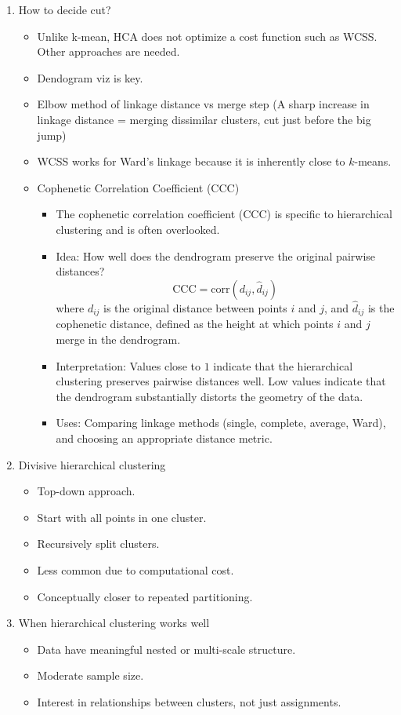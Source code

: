 \documentclass{article}
\begin{document}
\begin{enumerate}
\item How to decide cut?
\begin{itemize}
\item Unlike k-mean, HCA does not optimize a cost function such as WCSS. Other approaches are needed.
\item Dendogram viz is key. 
\item Elbow method of linkage distance vs merge step (A sharp increase in linkage distance = merging dissimilar clusters, cut just before the big jump)
\item WCSS works for Ward's linkage because it is inherently close to $k$-means.
\item Cophenetic Correlation Coefficient (CCC)
\begin{itemize}
\item The cophenetic correlation coefficient (CCC) is specific to hierarchical clustering and is often overlooked.
\item Idea: How well does the dendrogram preserve the original pairwise distances?
\[
\mathrm{CCC} = \mathrm{corr}\!\left( d_{ij}, \hat{d}_{ij} \right)
\]
where $d_{ij}$ is the original distance between points $i$ and $j$, and $\hat{d}_{ij}$ is the cophenetic distance, defined as the height at which points $i$ and $j$ merge in the dendrogram.
\item Interpretation: Values close to $1$ indicate that the hierarchical clustering preserves pairwise distances well. Low values indicate that the dendrogram substantially distorts the geometry of the data.
\item Uses: Comparing linkage methods (single, complete, average, Ward), and choosing an appropriate distance metric.
\end{itemize}
\end{itemize}

\item Divisive hierarchical clustering
\begin{itemize}
\item Top-down approach.
\item Start with all points in one cluster.
\item Recursively split clusters.
\item Less common due to computational cost.
\item Conceptually closer to repeated partitioning.
\end{itemize}

\item When hierarchical clustering works well
\begin{itemize}
\item Data have meaningful nested or multi-scale structure.
\item Moderate sample size.
\item Interest in relationships between clusters, not just assignments.
\end{itemize}


\end{enumerate}
\end{document}
